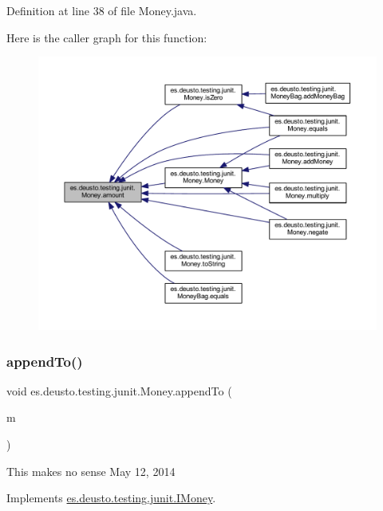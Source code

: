 Definition at line 38 of file Money.\+java.

Here is the caller graph for this function\+:
\nopagebreak
\begin{figure}[H]
\begin{center}
\leavevmode
\includegraphics[width=350pt]{classes_1_1deusto_1_1testing_1_1junit_1_1_money_a9bef5d9027f270e8ce0303e4f929bbd5_icgraph}
\end{center}
\end{figure}
\mbox{\label{classes_1_1deusto_1_1testing_1_1junit_1_1_money_aa9a6df9f35118060914ae6e8f74d1d51}} 
\subsubsection{\texorpdfstring{append\+To()}{appendTo()}}
{\footnotesize\ttfamily void es.\+deusto.\+testing.\+junit.\+Money.\+append\+To (\begin{DoxyParamCaption}\item[{\hyperlink{classes_1_1deusto_1_1testing_1_1junit_1_1_money_bag}{Money\+Bag}}]{m }\end{DoxyParamCaption})}

This makes no sense May 12, 2014 

Implements \hyperlink{interfacees_1_1deusto_1_1testing_1_1junit_1_1_i_money_ae45bc758e69a0017f083f11d050c53cb}{es.\+deusto.\+testing.\+junit.\+I\+Money}.



